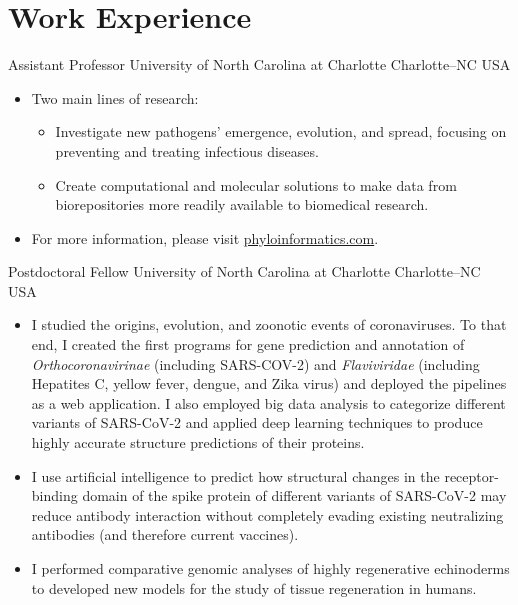 \documentclass[11pt, letterpaper, sans]{moderncv}
\begin{document}

\vspace{-1.5em}

\section{Work Experience}
		{Assistant Professor}
		{University of North Carolina at Charlotte}
		{Charlotte--NC}
		{USA}
		{}
	\vspace{-1em}
	\begin{itemize}[itemsep=-0.05in, labelindent=0in, leftmargin=1cm]\small
		\item[\textcolor{color1}{\textbullet}] Two main lines of research:
		\begin{itemize}[itemsep=-0.05in, labelindent=0in, leftmargin=1cm]\small
			\item[\textcolor{color1}{\textbullet}] Investigate new pathogens’ emergence, evolution, and spread, focusing on preventing and treating infectious diseases.
			\item[\textcolor{color1}{\textbullet}] Create computational and molecular solutions to make data from biorepositories more readily available to biomedical research.
	\end{itemize}
	\item[\textcolor{color1}{\textbullet}] For more information, please visit \href{https://phyloinformatics.com/}{phyloinformatics.com}.
	\end{itemize}
	\vspace{-0.5em}
    	{Postdoctoral Fellow}
    	{University of North Carolina at Charlotte}
    	{Charlotte--NC}
    	{USA}
    	{}
    \vspace{-1em}
    \begin{itemize}[itemsep=-0.05in, labelindent=0in, leftmargin=1cm]\small
	    \item[\textcolor{color1}{\textbullet}] I studied the origins, evolution, and zoonotic events of coronaviruses. To that end, I created the first programs for gene prediction and annotation of \textit{Orthocoronavirinae} (including SARS-COV-2) and \textit{Flaviviridae} (including Hepatites C, yellow fever, dengue, and Zika virus) and deployed the pipelines as a web application. I also employed big data analysis to categorize different variants of SARS-CoV-2 and applied deep learning techniques to produce highly accurate structure predictions of their proteins.
	    \item[\textcolor{color1}{\textbullet}] I use artificial intelligence to predict how structural changes in the receptor-binding domain of the spike protein of different variants of SARS-CoV-2 may reduce antibody interaction without completely evading existing neutralizing antibodies (and therefore current vaccines).
	    \item[\textcolor{color1}{\textbullet}] I performed comparative genomic analyses of highly regenerative echinoderms to developed new models for the study of tissue regeneration in humans.
	\end{itemize}
\end{document}

